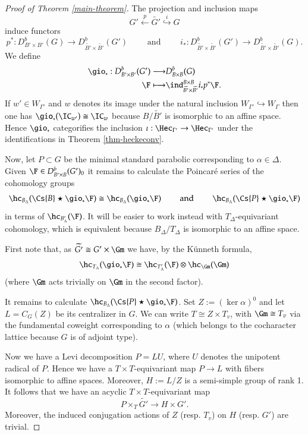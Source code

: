 \documentclass[12pt]{amsart}
\def\to{\rightarrow}
\theoremstyle{remark}
\begin{document}
\begin{proof}[Proof of Theorem \ref{main-theorem}]
  The projection and inclusion maps
\[
 G' \stackrel{p}{\leftarrow} \widetilde{G'}
 \stackrel{i}{\hookrightarrow} G
\]
induce functors $$p^* \colon D^b_{B' \times B'}(G) \to D^b_{\widetilde{B'} \times
  \widetilde{B'}}(G')\qquad\text{ and }\qquad i_* \colon D^b_{\widetilde{B'} \times
  \widetilde{B'}}(G') \to D^b_{\widetilde{B'} \times
  \widetilde{B'}}(G).$$ We define
\begin{eqnarray*}
 \gio_* : D^b_{B' \times B'} (G') \longrightarrow & D^b_{B \times B} (G) \\
\F \longmapsto & \ind^{B \times B}_{\widetilde{B'} \times
  \widetilde{B'}}i_* p^* \F.
\end{eqnarray*}
If $w' \in W_{\Gamma'}$ and $w$ denotes its image under the natural inclusion
$W_{\Gamma'} \hookrightarrow
W_{\Gamma}$ then one has $\gio_*( \IC_{w'}) \cong \IC_w$ because
$B/\widetilde{B'}$ is isomorphic to an affine space. 
Hence $\gio_*$ categorifies the inclusion $\iota : \Hec_{\Gamma'} \to
\Hec_{\Gamma'}$ under the identifications in Theorem
\ref{thm-heckeconv}.

Now, let $P\subset G$ be the minimal standard parabolic corresponding
to $\alpha \in \Delta$. Given $\F \in D^b_{B' \times B}(G')_0$  it remains to calculate the Poincar\'e series of the cohomology groups 
\[
\hc_{B_{\Delta}}(\Cs{B}\star \gio_* \F) \cong \hc_{B_{\Delta}}(\gio_* \F)\qquad 
\text{ and }\qquad 
\hc_{B_{\Delta}}(\Cs{P}\star \gio_* \F)
\]
in terms of $\hc_{B'_{\Delta}}( \F)$. It will be easier to work instead with
$T_{\Delta}$-equivariant cohomology, which is equivalent because
$B_{\Delta}/ T_{\Delta}$ is isomorphic to an affine space.

First note that, as $\widetilde{G'} \cong G' \times \Gm$ we have, by
the K\"unneth formula,
\begin{equation}\label{eq:Gm}
\hc_{T_{\Delta}}(\gio_* \F) \cong \hc_{T'_{\Delta}} (\F) \otimes \hc_{\Gm}(\Gm)
\end{equation}
(where $\Gm$ acts trivially on $\Gm$ in the second factor).

It remains to calculate $\hc_{B_{\Delta}}(\Cs{P}\star \gio_* \F)$.
Set $Z := (\ker \alpha)^0$ and let $L = C_G(Z)$ be its centralizer in
$G$. We can write $T \cong Z \times T_{v}$, with $\Gm \cong T_v$ via
the fundamental coweight corresponding to $\alpha$ (which belongs to
the cocharacter lattice because $G$ is of adjoint type). 

Now we have a Levi decomposition $P = LU$, where $U$ denotes the
unipotent radical of $P$. Hence we have a $T \times T$-equivariant
map $P \to L$ with fibers isomorphic to affine spaces. Moreover, $H :=
L/Z$ is a semi-simple group of rank 1. It follows that we have an acyclic $T
\times T$-equivariant map
\[
P \times_{T} \widetilde{G'} \to H \times G'.
\]
Moreover, the induced conjugation actions of $Z$ (resp. $T_v$) on $H$
(resp. $G'$) are trivial.


\end{proof}
\end{document}
